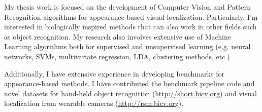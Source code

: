 My thesis work is focused on the development of Computer Vision and Pattern Recognition algorithms for appearance-based visual localization. Particularly, I'm interested in biologically inspired methods that can also work in other fields such as object recognition. My research also involves extensive use of Machine Learning algorithms both for supervised and unsupervised learning (e.g. neural networks, SVMs, multivariate regression, LDA, clustering methods, etc.)

Additionally, I have extensive experience in developing benchmarks for appearance-based methods. I have contributed the benchmark pipeline code and novel datasets for hand-held object recognition (\url{http://short.bicv.org}) and visual localization from wearable cameras (\url{http://rsm.bicv.org}).

